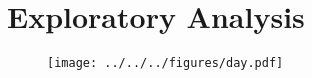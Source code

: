 \chapter{Exploratory Analysis}


\begin{figure}[H]
    \centering \texttt{[image: ../../../figures/day.pdf]}
    \caption{}
    \label{fig: }
    \end{figure}